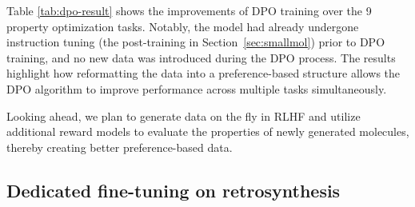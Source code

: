 Table \ref{tab:dpo-result} shows the improvements of DPO training over the 9 property optimization tasks. Notably, the model had already undergone instruction tuning (the post-training in Section~\ref{sec:smallmol}) prior to DPO training, and no new data was introduced during the DPO process. The results highlight how reformatting the data into a preference-based structure allows the DPO algorithm to improve performance across multiple tasks simultaneously.

Looking ahead, we plan to generate data on the fly in RLHF and utilize additional reward models to evaluate the properties of newly generated molecules, thereby creating better preference-based data.

\subsection{Dedicated fine-tuning on retrosynthesis}\label{sec:dedicate_tune}

